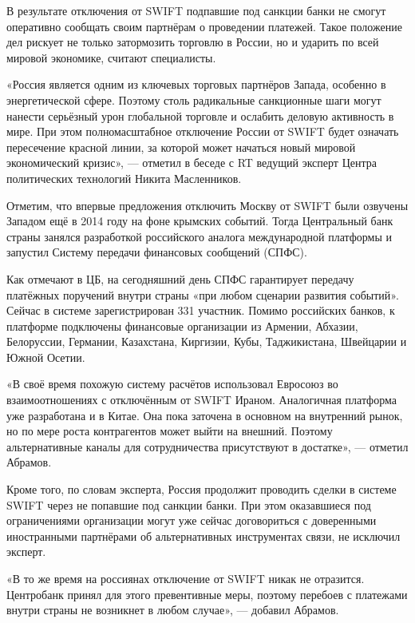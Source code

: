 В результате отключения от SWIFT подпавшие под санкции банки не смогут оперативно сообщать своим партнёрам о проведении платежей. Такое положение дел рискует не только затормозить торговлю в России, но и ударить по всей мировой экономике, считают специалисты.

«Россия является одним из ключевых торговых партнёров Запада, особенно в энергетической сфере. Поэтому столь радикальные санкционные шаги могут нанести серьёзный урон глобальной торговле и ослабить деловую активность в мире. При этом полномасштабное отключение России от SWIFT будет означать пересечение красной линии, за которой может начаться новый мировой экономический кризис», --- отметил в беседе с RT ведущий эксперт Центра политических технологий Никита Масленников.

Отметим, что впервые предложения отключить Москву от SWIFT были озвучены Западом ещё в 2014 году на фоне крымских событий. Тогда Центральный банк страны занялся разработкой российского аналога международной платформы и запустил Систему передачи финансовых сообщений (СПФС).


Как отмечают в ЦБ, на сегодняшний день СПФС гарантирует передачу платёжных поручений внутри страны «при любом сценарии развития событий». Сейчас в системе зарегистрирован 331 участник. Помимо российских банков, к платформе подключены финансовые организации из Армении, Абхазии, Белоруссии, Германии, Казахстана, Киргизии, Кубы, Таджикистана, Швейцарии и Южной Осетии.

«В своё время похожую систему расчётов использовал Евросоюз во взаимоотношениях с отключённым от SWIFT Ираном. Аналогичная платформа уже разработана и в Китае. Она пока заточена в основном на внутренний рынок, но по мере роста контрагентов может выйти на внешний. Поэтому альтернативные каналы для сотрудничества присутствуют в достатке», --- отметил Абрамов.

Кроме того, по словам эксперта, Россия продолжит проводить сделки в системе SWIFT через не попавшие под санкции банки. При этом оказавшиеся под ограничениями организации могут уже сейчас договориться с доверенными иностранными партнёрами об альтернативных инструментах связи, не исключил эксперт.

\begin{fancyquotes}
    «В то же время на россиянах отключение от SWIFT никак не отразится. Центробанк принял для этого превентивные меры, поэтому перебоев с платежами внутри страны не возникнет в любом случае», --- добавил Абрамов.
\end{fancyquotes}

